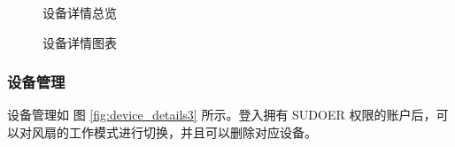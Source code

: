 \documentclass[UTF8]{ctexart}
\begin{document}
\begin{figure}[H]
    \noindent{}
    \caption{设备详情总览}\label{fig:device_details}
\end{figure}
\begin{figure}[H]
    \noindent{}
    \caption{设备详情图表}\label{fig:device_details2}
\end{figure}
\subsubsection{设备管理}
设备管理如 图 \ref{fig:device_details3} 所示。登入拥有 SUDOER 权限的账户后，可以对风扇的工作模式进行切换，并且可以删除对应设备。 
\end{document}
